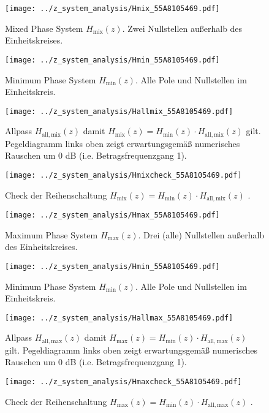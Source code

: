 \begin{figure}
\texttt{[image: ../z\_system\_analysis/Hmix\_55A8105469.pdf]}
\caption{Mixed Phase System $H_\mathrm{mix}(z)$. Zwei Nullstellen außerhalb
des Einheitskreises.}
\label{fig:Hmix_55A8105469}
\end{figure}
\begin{figure}
\texttt{[image: ../z\_system\_analysis/Hmin\_55A8105469.pdf]}
\caption{Minimum Phase System $H_\mathrm{min}(z)$. Alle Pole und Nullstellen
im Einheitskreis.}
\label{fig:Hmin_55A8105469}
\end{figure}
\begin{figure}
\texttt{[image: ../z\_system\_analysis/Hallmix\_55A8105469.pdf]}
\caption{Allpass $H_\mathrm{all,mix}(z)$ damit
$H_\mathrm{mix}(z) = H_\mathrm{min}(z) \cdot H_\mathrm{all,mix}(z)$ gilt.
Pegeldiagramm links oben zeigt erwartungsgemäß numerisches Rauschen um 0 dB (i.e. Betragsfrequenzgang 1).}
\label{fig:Hallmix_55A8105469}
\end{figure}
\begin{figure}
\texttt{[image: ../z\_system\_analysis/Hmixcheck\_55A8105469.pdf]}
\caption{Check der Reihenschaltung
$H_\mathrm{mix}(z) = H_\mathrm{min}(z) \cdot H_\mathrm{all,mix}(z)$ .}
\label{fig:Hmixcheck_55A8105469}
\end{figure}
%
\begin{figure}
\texttt{[image: ../z\_system\_analysis/Hmax\_55A8105469.pdf]}
\caption{Maximum Phase System $H_\mathrm{max}(z)$. Drei (alle) Nullstellen
außerhalb des Einheitskreises.}
\label{fig:Hmax_55A8105469}
\end{figure}
\begin{figure}
\texttt{[image: ../z\_system\_analysis/Hmin\_55A8105469.pdf]}
\caption{Minimum Phase System $H_\mathrm{min}(z)$. Alle Pole und Nullstellen
im Einheitskreis.}
\label{fig:Hmin_55A8105469_2}
\end{figure}
\begin{figure}
\texttt{[image: ../z\_system\_analysis/Hallmax\_55A8105469.pdf]}
\caption{Allpass $H_\mathrm{all,max}(z)$ damit
$H_\mathrm{max}(z) = H_\mathrm{min}(z) \cdot H_\mathrm{all,max}(z)$ gilt.
Pegeldiagramm links oben zeigt erwartungsgemäß numerisches Rauschen um 0 dB (i.e. Betragsfrequenzgang 1).}
\label{fig:Hallmax_55A8105469}
\end{figure}
\begin{figure}
\texttt{[image: ../z\_system\_analysis/Hmaxcheck\_55A8105469.pdf]}
\caption{Check der Reihenschaltung
$H_\mathrm{max}(z) = H_\mathrm{min}(z) \cdot H_\mathrm{all,max}(z)$ .}
\label{fig:Hmaxcheck_55A8105469}
\end{figure}
